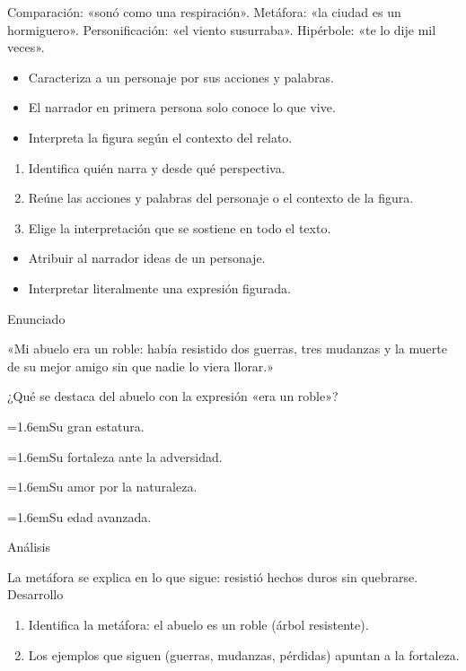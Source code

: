 \documentclass[10pt,a4paper,twocolumn]{article}
\newcommand{\alternativa}[2]{\par\noindent\hangindent=1.6em\hangafter=1\makebox[1.6em][l]{\tecla{#1}}#2\par}
\newcommand{\clave}[1]{\par\smallskip{\sffamily\footnotesize\color{esmeralda} Clave \teclaok{#1}}\par}
\begin{document}
\begin{definicion}
Comparación: «sonó como una respiración». Metáfora: «la ciudad es un hormiguero». Personificación: «el viento susurraba». Hipérbole: «te lo dije mil veces».
\end{definicion}

\begin{ideasclave}
\begin{itemize}
  \item Caracteriza a un personaje por sus acciones y palabras.
  \item El narrador en primera persona solo conoce lo que vive.
  \item Interpreta la figura según el contexto del relato.
\end{itemize}
\end{ideasclave}

\begin{metodo}
\begin{enumerate}
  \item Identifica quién narra y desde qué perspectiva.
  \item Reúne las acciones y palabras del personaje o el contexto de la figura.
  \item Elige la interpretación que se sostiene en todo el texto.
\end{enumerate}
\end{metodo}

\begin{errorfrecuente}
\begin{itemize}
  \item Atribuir al narrador ideas de un personaje.
  \item Interpretar literalmente una expresión figurada.
\end{itemize}
\end{errorfrecuente}

\begin{ejemplo}
{\sffamily\footnotesize\color{zinc500} Enunciado}\par
«Mi abuelo era un roble: había resistido dos guerras, tres mudanzas y la muerte de su mejor amigo sin que nadie lo viera llorar.»

¿Qué se destaca del abuelo con la expresión «era un roble»?
\alternativa{A}{Su gran estatura.}
\alternativa{B}{Su fortaleza ante la adversidad.}
\alternativa{C}{Su amor por la naturaleza.}
\alternativa{D}{Su edad avanzada.}
\clave{B}
{\sffamily\footnotesize\color{zinc500} Análisis}\par La metáfora se explica en lo que sigue: resistió hechos duros sin quebrarse.
{\sffamily\footnotesize\color{zinc500} Desarrollo}
\begin{enumerate}
  \item Identifica la metáfora: el abuelo es un roble (árbol resistente).
  \item Los ejemplos que siguen (guerras, mudanzas, pérdidas) apuntan a la fortaleza.
\end{enumerate}
\end{ejemplo}
\end{document}

